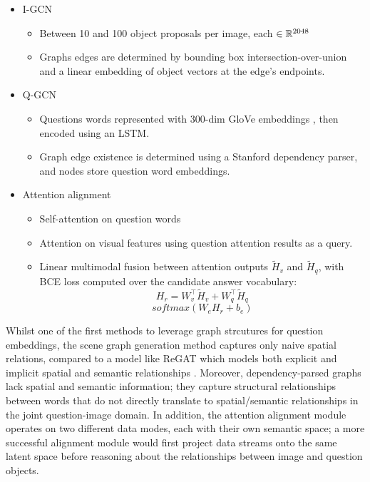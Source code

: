 \begin{itemize}
    \item I-GCN
    \begin{itemize}
        \item Between 10 and 100 object proposals per image, each \(\in \mathbb{R}^{2048}\)
        \item Graphs edges are determined by bounding box intersection-over-union and a linear embedding of object vectors at the edge's endpoints.
    \end{itemize}
    \item Q-GCN
    \begin{itemize}
        \item Questions words represented with 300-dim GloVe embeddings \cite{pennington2014glove}, then encoded using an LSTM.
        \item Graph edge existence is determined using a Stanford dependency parser, and nodes store question word embeddings.
    \end{itemize}
    \item Attention alignment
    \begin{itemize}
        \item Self-attention on question words
        \item Attention on visual features using question attention results as a query.
        \item Linear multimodal fusion between attention outputs \(\tilde{H}_v\) and \(\tilde{H}_q\), with BCE loss computed over the candidate answer vocabulary:
        \[H_r = W_v^\top \tilde{H}_v + W_q^\top \tilde{H}_q\]
        \[softmax(W_e H_r + b_e)\]    
    \end{itemize}
\end{itemize}
Whilst one of the first methods to leverage graph strcutures for question embeddings, the scene graph generation method captures only naive spatial relations, compared to a model like ReGAT which models both explicit and implicit spatial and semantic relationships \cite{li2019relation}. Moreover, dependency-parsed graphs lack spatial and semantic information; they capture structural relationships between words that do not directly translate to spatial/semantic relationships in the joint question-image domain. In addition, the attention alignment module operates on two different data modes, each with their own semantic space; a more successful alignment module would first project data streams onto the same latent space before reasoning about the relationships between image and question objects.

